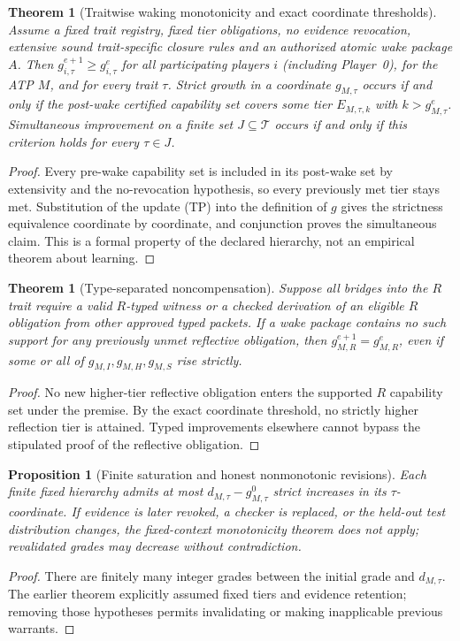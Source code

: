 \documentclass[11pt,letterpaper]{article}
\theoremstyle{definition}
\theoremstyle{plain}
\newtheorem{theorem}[definition]{Theorem}
\newtheorem{proposition}[definition]{Proposition}
\theoremstyle{definition}
\begin{document}
\begin{theorem}[Traitwise waking monotonicity and exact coordinate thresholds]
Assume a fixed trait registry, fixed tier obligations, no evidence revocation, extensive sound trait-specific closure rules and an authorized atomic wake package $A$. Then $g_{i,\tau}^{e+1}\geq g_{i,\tau}^{e}$ for all participating players $i$ (including Player~0), for the ATP $M$, and for every trait $\tau$. Strict growth in a coordinate $g_{M,\tau}$ occurs if and only if the post-wake certified capability set covers some tier $E_{M,\tau,k}$ with $k>g_{M,\tau}^{e}$. Simultaneous improvement on a finite set $J\subseteq\mathcal T$ occurs if and only if this criterion holds for every $\tau\in J$.
\end{theorem}
\begin{proof}
Every pre-wake capability set is included in its post-wake set by extensivity and the no-revocation hypothesis, so every previously met tier stays met. Substitution of the update (TP) into the definition of $g$ gives the strictness equivalence coordinate by coordinate, and conjunction proves the simultaneous claim. This is a formal property of the declared hierarchy, not an empirical theorem about learning.
\end{proof}

\begin{theorem}[Type-separated noncompensation]
Suppose all bridges into the $R$ trait require a valid $R$-typed witness or a checked derivation of an eligible $R$ obligation from other approved typed packets. If a wake package contains no such support for any previously unmet reflective obligation, then $g_{M,R}^{e+1}=g_{M,R}^{e}$, even if some or all of $g_{M,I},g_{M,H},g_{M,S}$ rise strictly.
\end{theorem}
\begin{proof}
No new higher-tier reflective obligation enters the supported $R$ capability set under the premise. By the exact coordinate threshold, no strictly higher reflection tier is attained. Typed improvements elsewhere cannot bypass the stipulated proof of the reflective obligation.
\end{proof}

\begin{proposition}[Finite saturation and honest nonmonotonic revisions]
Each finite fixed hierarchy admits at most $d_{M,\tau}-g_{M,\tau}^0$ strict increases in its $\tau$-coordinate. If evidence is later revoked, a checker is replaced, or the held-out test distribution changes, the fixed-context monotonicity theorem does not apply; revalidated grades may decrease without contradiction.
\end{proposition}
\begin{proof}There are finitely many integer grades between the initial grade and $d_{M,\tau}$. The earlier theorem explicitly assumed fixed tiers and evidence retention; removing those hypotheses permits invalidating or making inapplicable previous warrants.\end{proof}
\end{document}
